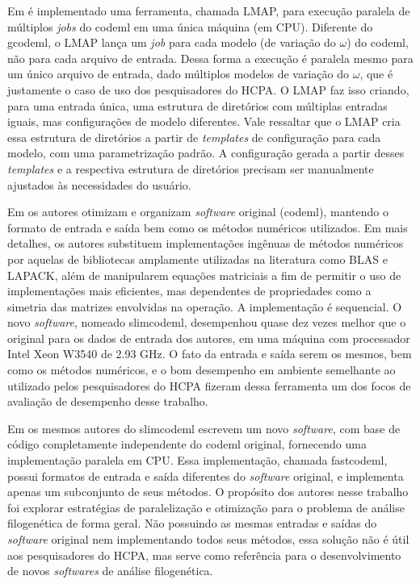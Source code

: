 \documentclass[cic,tc]{iiufrgs}
\begin{document}
Em \cite{maldonado2016lmap} é implementado uma
ferramenta, chamada LMAP, para execução paralela de múltiplos \textit{jobs} do
codeml em uma única máquina (em CPU). Diferente do gcodeml, o LMAP lança um
\textit{job} para cada modelo (de variação do $\omega$) do codeml, não para
cada arquivo de entrada. Dessa forma a execução é paralela mesmo para um único
arquivo de entrada, dado múltiplos modelos de variação do $\omega$, que é
justamente o caso de uso dos pesquisadores do HCPA. O LMAP faz isso criando,
para uma entrada única, uma estrutura de diretórios com múltiplas entradas
iguais, mas configurações de modelo diferentes. Vale ressaltar que o LMAP cria
essa estrutura de diretórios a partir de \textit{templates} de configuração
para cada modelo, com uma parametrização padrão. A configuração gerada a partir
desses \textit{templates} e a respectiva estrutura de diretórios precisam ser
manualmente ajustados às necessidades do usuário. 

Em \cite{schabauer2012slimcodeml} os autores otimizam e organizam \textit{software}
original (codeml), mantendo o formato de entrada e saída bem como os métodos
numéricos utilizados. Em mais detalhes, os autores substituem implementações
ingênuas de métodos numéricos por aquelas de bibliotecas amplamente utilizadas
na literatura como BLAS e LAPACK, além de manipularem equações matriciais a fim
de permitir o uso de implementações mais eficientes, mas dependentes de
propriedades como a simetria das matrizes envolvidas na operação. A
implementação é sequencial. O novo \textit{software}, nomeado slimcodeml, desempenhou
quase dez vezes melhor que o original para os dados de entrada dos autores, em
uma máquina com processador Intel Xeon W3540 de 2.93 GHz. O fato da entrada e
saída serem os mesmos, bem como os métodos numéricos, e o bom desempenho em
ambiente semelhante ao utilizado pelos pesquisadores do HCPA fizeram dessa
ferramenta um dos focos de avaliação de desempenho desse trabalho.

Em \cite{valle2014optimization} os mesmos autores do slimcodeml escrevem um
novo \textit{software}, com base de código completamente independente do codeml
original, fornecendo uma implementação paralela em CPU. Essa implementação,
chamada fastcodeml, possui formatos de entrada e saída diferentes do \textit{software}
original, e implementa apenas um subconjunto de seus métodos. O propósito dos
autores nesse trabalho foi explorar estratégias de paralelização e otimização
para o problema de análise filogenética de forma geral. Não possuindo as mesmas
entradas e saídas do \textit{software} original nem implementando todos seus métodos,
essa solução não é útil aos pesquisadores do HCPA, mas serve como referência
para o desenvolvimento de novos \textit{softwares} de análise filogenética.
\end{document}
